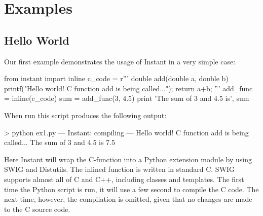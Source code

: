 \section{Examples}
\label{wilbers:sec:examples}
%
%
%
\subsection{Hello World}
Our first example demonstrates the usage of Instant in a very simple case:
\begin{python}
from instant import inline
c_code = r'''
double add(double a, double b)
{
  printf("Hello world! C function add is being called...\n");
  return a+b;
}'''
add_func = inline(c_code)
sum = add_func(3, 4.5)
print 'The sum of 3 and 4.5 is', sum
\end{python}
When run this script produces the following output: 
\begin{python}
 > python ex1.py 
--- Instant: compiling ---
Hello world! C function add is being called...
The sum of 3 and 4.5 is 7.5
\end{python}
Here Instant will wrap the C-function  into a Python extension module by using
SWIG and Distutils.
The inlined function is written in standard C. SWIG supports almost
all of C and C++, including classes and templates. 
The first time the Python script is run, it will use a few second to compile the C code.  
The next time, however, the compilation is omitted, given that no changes are made to the
C source code.

